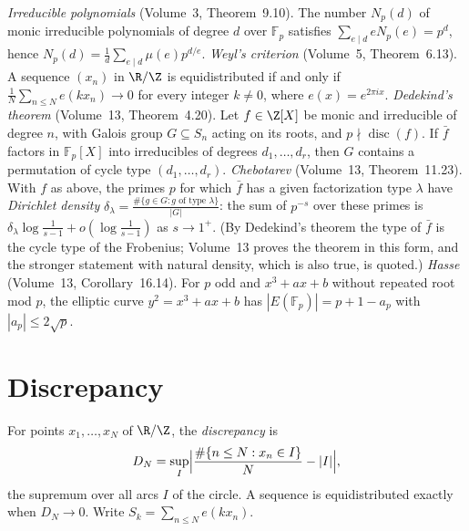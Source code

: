 \begin{reminder}
\emph{Irreducible polynomials} (Volume~3, Theorem~9.10). The number $N_p(d)$ of monic irreducible polynomials of degree $d$ over $\mathbb F_p$ satisfies $\sum_{e\mid d}eN_p(e)=p^d$, hence $N_p(d)=\frac1d\sum_{e\mid d}\mu(e)p^{d/e}$.
\emph{Weyl's criterion} (Volume~5, Theorem~6.13). A sequence $(x_n)$ in $\R/\Z$ is equidistributed if and only if $\frac1N\sum_{n\le N}e(kx_n)\to0$ for every integer $k\ne0$, where $e(x)=e^{2\pi ix}$.
\emph{Dedekind's theorem} (Volume~13, Theorem~4.20). Let $f\in\Z[X]$ be monic and irreducible of degree $n$, with Galois group $G\subseteq S_n$ acting on its roots, and $p\nmid\operatorname{disc}(f)$. If $\bar f$ factors in $\mathbb F_p[X]$ into irreducibles of degrees $d_1,\dots,d_r$, then $G$ contains a permutation of cycle type $(d_1,\dots,d_r)$.
\emph{Chebotarev} (Volume~13, Theorem~11.23). With $f$ as above, the primes $p$ for which $\bar f$ has a given factorization type $\lambda$ have \emph{Dirichlet density} $\delta_\lambda=\frac{\#\{g\in G:g\text{ of type }\lambda\}}{|G|}$: the sum of $p^{-s}$ over these primes is $\delta_\lambda\log\frac1{s-1}+o(\log\frac1{s-1})$ as $s\to1^+$. (By Dedekind's theorem the type of $\bar f$ is the cycle type of the Frobenius; Volume~13 proves the theorem in this form, and the stronger statement with natural density, which is also true, is quoted.)
\emph{Hasse} (Volume~13, Corollary~16.14). For $p$ odd and $x^3+ax+b$ without repeated root mod $p$, the elliptic curve $y^2=x^3+ax+b$ has $|E(\mathbb F_p)|=p+1-a_p$ with $|a_p|\le2\sqrt p$.
\end{reminder}

\section{Discrepancy}

For points $x_1,\dots,x_N$ of $\R/\Z$, the \emph{discrepancy} is
\[
D_N=\sup_I\Bigl|\frac{\#\{n\le N:x_n\in I\}}N-|I|\Bigr|,
\]
the supremum over all arcs $I$ of the circle. A sequence is equidistributed exactly when $D_N\to0$. Write $S_k=\sum_{n\le N}e(kx_n)$.

